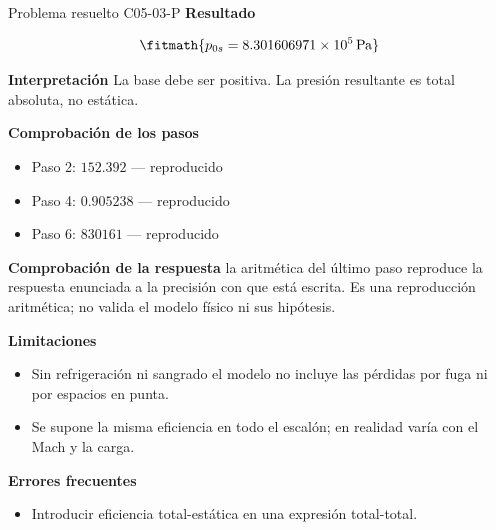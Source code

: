 \documentclass[10pt,openany]{book}
\begin{document}
\begin{studiumworked}{Problema resuelto C05-03-P}
\noindent\textbf{Resultado}

\[
\fitmath{p_{0s}=8.301606971\times10^{5}\,\mathrm{Pa}}
\]

\noindent\textbf{Interpretación}
La base debe ser positiva. La presión resultante es total absoluta, no estática.

\noindent\textbf{Comprobación de los pasos}
\begin{itemize}
\item Paso 2: $152.392$ — reproducido
\item Paso 4: $0.905238$ — reproducido
\item Paso 6: $830161$ — reproducido
\end{itemize}

\noindent\textbf{Comprobación de la respuesta} la aritmética del último paso reproduce la respuesta enunciada a la precisión con que está escrita. Es una reproducción aritmética; no valida el modelo físico ni sus hipótesis.

\noindent\textbf{Limitaciones}
\begin{itemize}
\item Sin refrigeración ni sangrado el modelo no incluye las pérdidas por fuga ni por espacios en punta.
\item Se supone la misma eficiencia en todo el escalón; en realidad varía con el Mach y la carga.
\end{itemize}

\noindent\textbf{Errores frecuentes}
\begin{itemize}
\item Introducir eficiencia total-estática en una expresión total-total.
\end{itemize}
\end{studiumworked}
\end{document}
